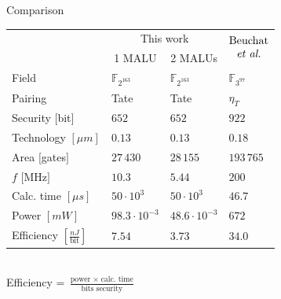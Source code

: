 \documentclass[svgnames]{beamer}
\begin{document}
\begin{frame}{Comparison}
\begin{center}
\small{\begin{tabular}{llll}
			\\[-1.5em] \toprule
			&	\multicolumn{2}{c}{This work}	& \multirow{2}{*}{$\begin{array}{@{}c@{}}\text{Beuchat}\\\text{\emph{et al.}}\end{array}$}\\
			\cmidrule(r){2-3}
			& \multicolumn{1}{c}{1 MALU} & \multicolumn{1}{c}{2 MALUs} &\\
	 		\midrule
			Field																& $\mathbb{F}_{2^{163}}$	& $\mathbb{F}_{2^{163}}$	& $\mathbb{F}_{3^{97}}$\\
			Pairing															& Tate							& Tate							& $\eta_T$\\
			Security $[$bit$]$											& $652$							& $652$							& $922$\\
			Technology $[\mu m]$											& $0.13$							& $0.13$							& $0.18$\\
			Area $[$gates$]$												& $27\,430$						& $28\,155$						& $193\,765$\\
			$f$ $[$MHz$]$													& $10.3$							& $5.44$							& $200$\\
			Calc. time $[\mu s]$											& $50 \cdot 10^3$				& $50 \cdot 10^3$				& $46.7$\\
			Power $[mW]$													& $98.3 \cdot 10^{-3}$		& $48.6 \cdot 10^{-3}$		& $672$\\
			Efficiency $\left[ \frac{nJ}{\text{bit}}\right]$	& $7.54$							& $3.73$							& $34.0$\\
			\bottomrule		
		\end{tabular}}
		
		\\[1.5em]
		
		Efficiency = $\frac{\text{power} \; \times \; \text{calc. time}}{\text{bits security}}$
\end{center}
\end{frame}
\end{document}
